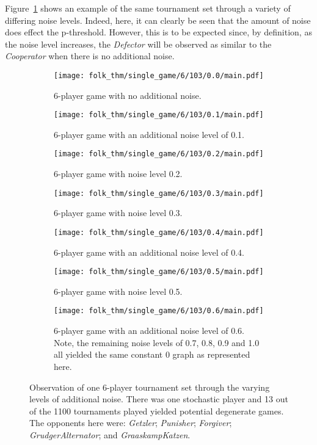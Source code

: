 Figure~\ref{fig:single_set_vary_noise} shows an example of the same tournament set through a variety of
differing noise levels. Indeed, here, it can clearly be seen that the amount of
noise does effect the p-threshold. However, this is to be expected since, by
definition, as the noise level increases, the \textit{Defector} will be observed
as similar to the \textit{Cooperator} when there is no additional noise.

\begin{figure}
    \begin{subfigure}{0.3\textwidth}
        \centering
        \texttt{[image: folk\_thm/single\_game/6/103/0.0/main.pdf]}
        \caption{6-player game with no additional noise.}
    \end{subfigure}
    \begin{subfigure}{0.3\textwidth}
        \centering
        \texttt{[image: folk\_thm/single\_game/6/103/0.1/main.pdf]}
        \caption{6-player game with an additional noise level of 0.1.}
    \end{subfigure}
    \begin{subfigure}{0.3\textwidth}
        \centering
        \texttt{[image: folk\_thm/single\_game/6/103/0.2/main.pdf]}
        \caption{6-player game with noise level 0.2.}
    \end{subfigure}

    \begin{subfigure}{0.2\textwidth}
        \centering
        \texttt{[image: folk\_thm/single\_game/6/103/0.3/main.pdf]}
        \caption{6-player game with noise level 0.3.}
    \end{subfigure}
    \begin{subfigure}{0.2\textwidth}
        \centering
        \texttt{[image: folk\_thm/single\_game/6/103/0.4/main.pdf]}
        \caption{6-player game with an additional noise level of 0.4.}
    \end{subfigure}
    \begin{subfigure}{0.2\textwidth}
        \centering
        \texttt{[image: folk\_thm/single\_game/6/103/0.5/main.pdf]}
        \caption{6-player game with noise level 0.5.}
    \end{subfigure}
    \begin{subfigure}{0.2\textwidth}
        \centering
        \texttt{[image: folk\_thm/single\_game/6/103/0.6/main.pdf]}
        \caption{6-player game with an additional noise level of 0.6. Note, the remaining noise levels of 0.7, 0.8, 0.9 and 1.0 all yielded the same constant 0 graph as represented here.}
    \end{subfigure}
    \caption{Observation of one 6-player tournament set through the varying
    levels of additional noise. There was one stochastic player and 13 out of
    the 1100 tournaments played yielded potential degenerate games. The opponents here were: \textit{Getzler};
    \textit{Punisher}; \textit{Forgiver}; \textit{GrudgerAlternator}; and \textit{GraaskampKatzen}.}\label{fig:single_set_vary_noise}
\end{figure}

